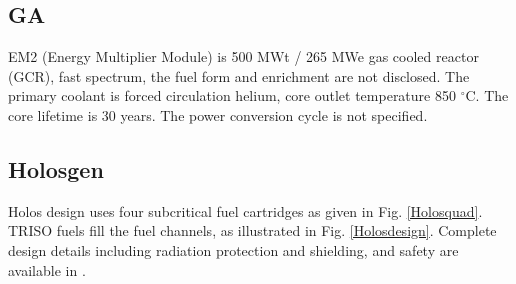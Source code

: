 \restoregeometry
\pagebreak

\subsection{GA}
EM2 (Energy Multiplier Module) is 500 MWt / 265 MWe gas cooled reactor (GCR), fast spectrum, the fuel form and enrichment are not disclosed. The primary coolant is forced circulation helium, core outlet temperature 850 $^\circ{}$C. The core lifetime is 30 years. The power conversion cycle is not specified.

\subsection{Holosgen}
Holos design uses four subcritical fuel cartridges as given in Fig. \ref{Holosquad}. TRISO fuels fill the fuel channels, as illustrated in Fig. \ref{Holosdesign}. Complete design details including radiation protection and shielding, and safety are available in \cite{filippone_holos_2017}.

